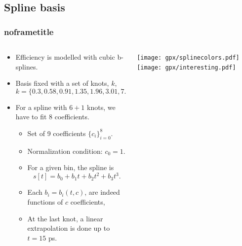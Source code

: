\documentclass[aspectratio=169,9pt,handout]{beamer}
\newcommand{\pdfnote}[1]{}
\begin{document}
\subsection{Spline basis}
\begin{frame}[default] %
\frametitle{noframetitle}

\begin{columns}%
  \begin{column}{0.6\textwidth}
    \begin{itemize}
      \item Efficiency is modelled with cubic b-splines.
      \item Basis fixed with a set of knots, $k$, $$k = \{0.3, 0.58, 0.91, 1.35, 1.96, 3.01,7.00\}$$
      \vspace*{-3mm}
      \item For a spline with $6+1$ knots, we have to fit $8$ coefficients.
      \begin{itemize}
        \item Set of 9 coefficients $\{c_i\}_{i=0}^{8}$.
        \item Normalization condition: $c_0=1$.
        \item For a given bin, the spline is $$  s[t] = b_0 + b_1 t + b_2 t^2 + b_3 t^3. $$
        \item Each $b_i = b_i(t,c)$, are indeed functions of $c$ coefficients,
        \item At the last knot, a linear extrapolation is done up to $t = 15$ ps.
      \end{itemize}
    \end{itemize}
  \end{column}
  \begin{column}{0.35\textwidth}
    \texttt{[image: gpx/splinecolors.pdf]}
    \texttt{[image: gpx/interesting.pdf]}
  \end{column}
\end{columns}

\pdfnote{Digging a bit in how these splines are built, first thing is they actually are b-spline, so they need a basis. We fix it with a set of knots wich we exponentialy distibute from 0.3 to 15 ps (last knot is moved to 7ps because of very low statistics in that bin)}
\pdfnote{For s spline of 6+1 knots, we have to fit 8 coefficients since the first one can be fixed to 1 as a normalization condition. In each bin, the spline has the form third degree polynomial we see here, where each b coefficient is actually function of the c coefficients depending in which time bin the event lies on}
\pdfnote{A linear extrapolation is done up to 15 ps. We can see at top right a how a efficiency is build from each of the bsplines. And at bottom right, a exponential convoluted with a gaussian times a spline is shown for ilustration purposes.}

\end{frame} %
\end{document}
